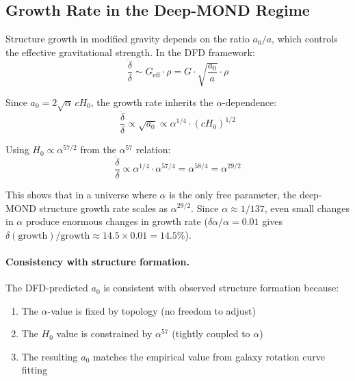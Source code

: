 \documentclass[12pt,a4paper]{article}
\newcommand{\Hzero}{H_0}
\begin{document}
\subsection{Growth Rate in the Deep-MOND Regime}

Structure growth in modified gravity depends on the ratio $a_0/a$, which
controls the effective gravitational strength. In the DFD framework:
\begin{equation}
\frac{\ddot{\delta}}{\delta}
\sim G_{\mathrm{eff}} \cdot \rho
= G \cdot \sqrt{\frac{a_0}{a}} \cdot \rho
\end{equation}

Since $a_0 = 2\sqrt{\alpha}\,c\Hzero$, the growth rate inherits the
$\alpha$-dependence:
\begin{equation}
\frac{\ddot{\delta}}{\delta}
\propto \sqrt{a_0} \propto \alpha^{1/4} \cdot (c\Hzero)^{1/2}
\end{equation}

Using $\Hzero \propto \alpha^{57/2}$ from the $\alpha^{57}$ relation:
\begin{equation}
\frac{\ddot{\delta}}{\delta}
\propto \alpha^{1/4} \cdot \alpha^{57/4}
= \alpha^{58/4} = \alpha^{29/2}
\end{equation}

This shows that in a universe where $\alpha$ is the only free parameter,
the deep-MOND structure growth rate scales as $\alpha^{29/2}$. Since
$\alpha \approx 1/137$, even small changes in $\alpha$ produce enormous
changes in growth rate ($\delta \alpha/\alpha = 0.01$ gives
$\delta(\text{growth})/\text{growth} \approx 14.5 \times 0.01 = 14.5\%$).

\paragraph{Consistency with structure formation.}
The DFD-predicted $a_0$ is consistent with observed structure formation
because:
\begin{enumerate}
\item The $\alpha$-value is fixed by topology (no freedom to adjust)
\item The $\Hzero$ value is constrained by $\alpha^{57}$ (tightly coupled
  to $\alpha$)
\item The resulting $a_0$ matches the empirical value from galaxy rotation
  curve fitting
\end{enumerate}
\end{document}
